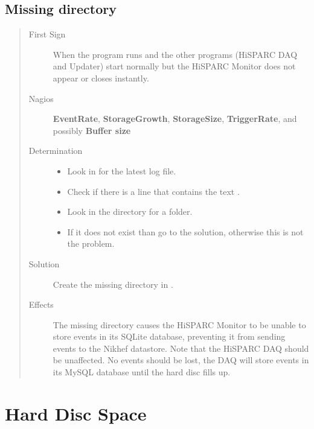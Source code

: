 \documentclass[a4paper,11pt,english]{sphinxmanual}
\begin{document}
\subsection{Missing directory}
\label{known-issues:missing-directory}\begin{quote}\begin{description}
\item[{First Sign}] \leavevmode
When the  program runs and the other programs (HiSPARC DAQ and Updater) start normally but the HiSPARC Monitor does not appear or closes instantly.

\item[{Nagios}] \leavevmode
\textbf{EventRate}, \textbf{StorageGrowth}, \textbf{StorageSize}, \textbf{TriggerRate}, and possibly \textbf{Buffer size}

\item[{Determination}] \leavevmode\begin{itemize}
\item {} 
Look in  for the latest log file.

\item {} 
Check if there is a line that contains the text .

\item {} 
Look in the  directory for a  folder.

\item {} 
If it does not exist than go to the solution, otherwise this is not the problem.

\end{itemize}

\item[{Solution}] \leavevmode
Create the missing  directory in .

\item[{Effects}] \leavevmode
The missing directory causes the HiSPARC Monitor to be unable to store events in its SQLite database, preventing it from sending events to the Nikhef datastore. Note that the HiSPARC DAQ should be unaffected. No events should be lost, the DAQ will store events in its MySQL database until the hard disc fills up.

\end{description}\end{quote}


\section{Hard Disc Space}
\label{known-issues:hard-disc-space}
\end{document}
